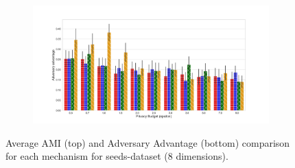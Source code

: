 \begin{figure}[H]
\begin{subfigure}{1\textwidth}
    \end{subfigure}
    \begin{subfigure}{1\textwidth}
        \includegraphics[width=1\textwidth]{Results/kd-laplace/shokri_mi_adv_seeds-dataset_comparison.png}
    \end{subfigure}
    \caption{Average AMI (top) and Adversary Advantage (bottom) comparison for each mechanism for seeds-dataset (8 dimensions).}
    \label{fig:utility_seeds-dataset_comparison_nd_plot}
\end{figure}
\newpage


